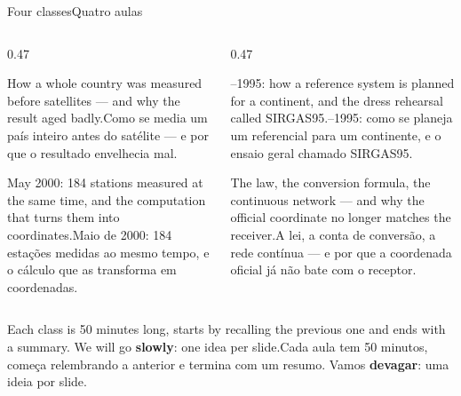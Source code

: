 \documentclass[aspectratio=169,11pt]{beamer}
\newcommand{\tr}[2]{\ifEN#2\else#1\fi}
\newcommand{\bnum}[1]{\ifmmode\textcolor{mTeal}{\mathbf{#1}}\else\textbf{\textcolor{mTeal}{#1}}\fi}
\begin{document}
\begin{frame}{\tr{Quatro aulas}{Four classes}}
  \begin{columns}[T]
    \begin{column}{0.47\textwidth}
      \begin{regra}[title={\tr{Aula 1 · O problema herdado}{Class 1 · The inherited problem}}]
        \small\tr{Como se media um país inteiro antes do satélite --- e por que o resultado
        envelhecia mal.}{How a whole country was measured before satellites --- and why the
        result aged badly.}
      \end{regra}
      \vspace{2pt}
      \begin{regra}[title={\tr{Aula 3 · A realização}{Class 3 · The realization}}]
        \small\tr{Maio de 2000: 184 estações medidas ao mesmo tempo, e o cálculo que as
        transforma em coordenadas.}{May 2000: 184 stations measured at the same time, and the
        computation that turns them into coordinates.}
      \end{regra}
    \end{column}
    \begin{column}{0.47\textwidth}
      \begin{regra}[title={\tr{Aula 2 · A idealização}{Class 2 · The design}}]
        \small\tr{1993--1995: como se planeja um referencial para um continente, e o ensaio
        geral chamado SIRGAS95.}{1993--1995: how a reference system is planned for a
        continent, and the dress rehearsal called SIRGAS95.}
      \end{regra}
      \vspace{2pt}
      \begin{regra}[title={\tr{Aula 4 · Adoção e vida útil}{Class 4 · Adoption and lifetime}}]
        \small\tr{A lei, a conta de conversão, a rede contínua --- e por que a coordenada
        oficial já não bate com o receptor.}{The law, the conversion formula, the continuous
        network --- and why the official coordinate no longer matches the receiver.}
      \end{regra}
    \end{column}
  \end{columns}
  \medskip
  \centering
  \tr{Cada aula tem 50 minutos, começa relembrando a anterior e termina com um resumo. Vamos
  \bnum{devagar}: uma ideia por slide.}{Each class is 50 minutes long, starts by recalling the
  previous one and ends with a summary. We will go \bnum{slowly}: one idea per slide.}
\end{frame}
\end{document}
